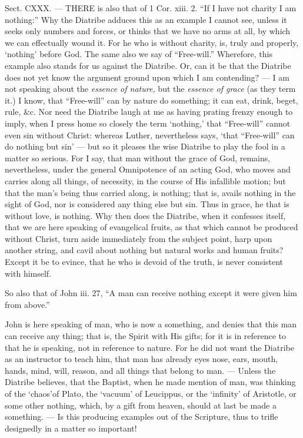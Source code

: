 
Sect. CXXX. — THERE is also that of 1 Cor. xiii. 2. “If I have not charity I am nothing:” Why the Diatribe adduces this as an example I cannot see, unless it seeks only numbers and forces, or thinks that we have no arms at all, by which we can effectually wound it. For he who is without charity, is, truly and properly, ‘nothing’ before God. The same also we say of “Free-will.” Wherefore, this example also stands for us against the Diatribe. Or, can it be that the Diatribe does not yet know the argument ground upon which I am contending? — I am not speaking about the \emph{essence of nature, }but the \emph{essence of grace }(as they term it.) I know, that “Free-will” can by nature do something; it can eat, drink, beget, rule, \&c. Nor need the Diatribe laugh at me as having prating frenzy enough to imply, when I press home so closely the term ‘nothing,’ that “Free-will” cannot even sin without Christ: whereas Luther, nevertheless says, ‘that “Free-will” can do nothing but sin’ — but so it pleases the wise Diatribe to play the fool in a matter so serious. For I say, that man without the grace of God, remains, nevertheless, under the general Omnipotence of an acting God, who moves and carries along all things, of necessity, in the course of His infallible motion; but that the man’s being thus carried along, is nothing; that is, avails nothing in the sight of God, nor is considered any thing else but sin. Thus in grace, he that is without love, is nothing. Why then does the Diatribe, when it confesses itself, that we are here speaking of evangelical fruits, as that which cannot be produced without Christ, turn aside immediately from the subject point, harp upon another string, and cavil about nothing but natural works and human fruits? Except it be to evince, that he who is devoid of the truth, is never consistent with himself.

So also that of John iii. 27, “A man can receive nothing except it were given him from above.”

John is here speaking of man, who is now a something, and denies that this man can receive any thing; that is, the Spirit with His gifts; for it is in reference to that he is speaking, not in reference to nature. For he did not want the Diatribe as an instructor to teach him, that man has already eyes nose, ears, mouth, hands, mind, will, reason, and all things that belong to man. — Unless the Diatribe believes, that the Baptist, when he made mention of man, was thinking of the ‘chaos’of Plato, the ‘vacuum’ of Leucippus, or the ‘infinity’ of Aristotle, or some other nothing, which, by a gift from heaven, should at last be made a something. — Is this producing examples out of the Scripture, thus to trifle designedly in a matter so important!

